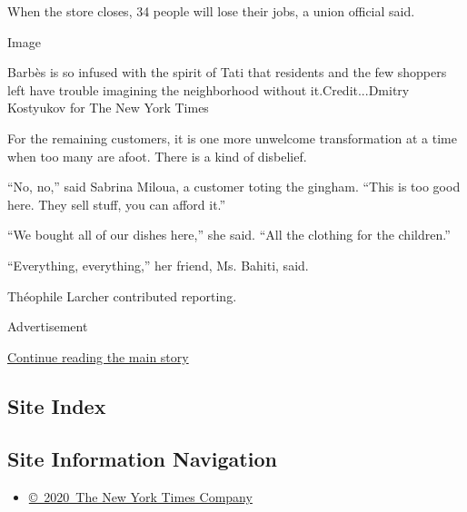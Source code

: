 When the store closes, 34 people will lose their jobs, a union official
said.

Image

Barbès is so infused with the spirit of Tati that residents and the few
shoppers left have trouble imagining the neighborhood without
it.Credit...Dmitry Kostyukov for The New York Times

For the remaining customers, it is one more unwelcome transformation at
a time when too many are afoot. There is a kind of disbelief.

``No, no,'' said Sabrina Miloua, a customer toting the gingham. ``This
is too good here. They sell stuff, you can afford it.''

``We bought all of our dishes here,'' she said. ``All the clothing for
the children.''

``Everything, everything,'' her friend, Ms. Bahiti, said.

Théophile Larcher contributed reporting.

Advertisement

\protect\hyperlink{after-bottom}{Continue reading the main story}

\hypertarget{site-index}{%
\subsection{Site Index}\label{site-index}}

\hypertarget{site-information-navigation}{%
\subsection{Site Information
Navigation}\label{site-information-navigation}}

\begin{itemize}
\tightlist
\item
  \href{https://help.nytimes3xbfgragh.onion/hc/en-us/articles/115014792127-Copyright-notice}{©~2020~The
  New York Times Company}
\end{itemize}

